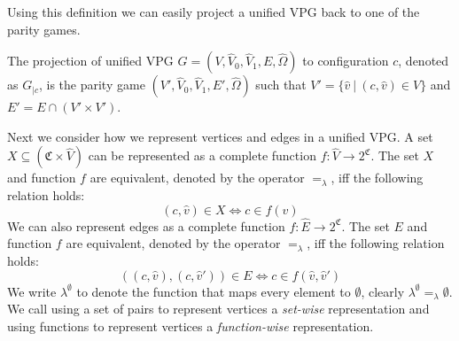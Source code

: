 Using this definition we can easily project a unified VPG back to one of the parity games.
\begin{definition}
	The projection of unified VPG $G = (V,\hat{V}_0, \hat{V}_1,E,\hat{\Omega})$ to configuration $c$, denoted as $G_{|c}$, is the parity game $(V',\hat{V}_0,\hat{V}_1,E',\hat{\Omega})$ such that $V' = \{ \hat{v}\ |\ (c,\hat{v}) \in V \}$ and $E' = E \cap (V' \times V')$.
\end{definition}

Next we consider how we represent vertices and edges in a unified VPG. A set $X \subseteq (\mathfrak{C} \times \hat{V})$ can be represented as a complete function $f : \hat{V} \rightarrow 2^\mathfrak{C}$. The set $X$ and function $f$ are equivalent, denoted by the operator $=_\lambda$, iff the following relation holds:
\[ (c,\hat{v}) \in X \iff c \in f(\hat{v}) \]
We can also represent edges as a complete function $f : \hat{E} \rightarrow 2^\mathfrak{C}$. The set $E$ and function $f$ are equivalent, denoted by the operator $=_\lambda$, iff the following relation holds:
\[ ((c,\hat{v}),(c,\hat{v}')) \in E \iff c \in f(\hat{v},\hat{v}') \]
We write $\lambda^\emptyset$ to denote the function that maps every element to $\emptyset$, clearly $\lambda^\emptyset =_\lambda \emptyset$. We call using a set of pairs to represent vertices a \textit{set-wise} representation and using functions to represent vertices a \textit{function-wise} representation.